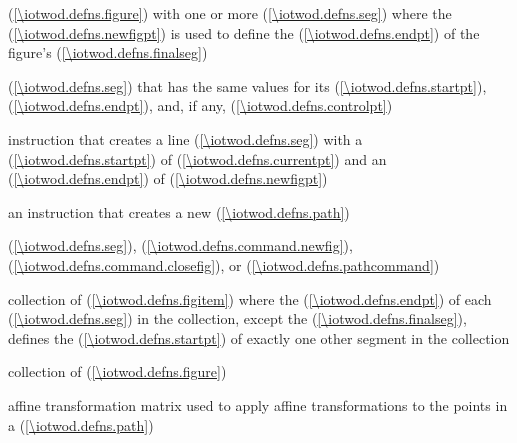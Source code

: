%
 (\ref{\iotwod.defns.figure}) with one or more  (\ref{\iotwod.defns.seg}) where the  (\ref{\iotwod.defns.newfigpt}) is used to define the  (\ref{\iotwod.defns.endpt}) of the figure's  (\ref{\iotwod.defns.finalseg})

%
 (\ref{\iotwod.defns.seg}) that has the same values for its  (\ref{\iotwod.defns.startpt}),  (\ref{\iotwod.defns.endpt}), and, if any,  (\ref{\iotwod.defns.controlpt})

%
 instruction that creates a line  (\ref{\iotwod.defns.seg}) with a  (\ref{\iotwod.defns.startpt}) of  (\ref{\iotwod.defns.currentpt}) and an  (\ref{\iotwod.defns.endpt}) of  (\ref{\iotwod.defns.newfigpt})

%
 an instruction that creates a new  (\ref{\iotwod.defns.path})

%
 (\ref{\iotwod.defns.seg}),  (\ref{\iotwod.defns.command.newfig}),  (\ref{\iotwod.defns.command.closefig}), or  (\ref{\iotwod.defns.pathcommand})

%
collection of  (\ref{\iotwod.defns.figitem}) where the  (\ref{\iotwod.defns.endpt}) of each  (\ref{\iotwod.defns.seg}) in the collection, except the  (\ref{\iotwod.defns.finalseg}), defines the  (\ref{\iotwod.defns.startpt}) of exactly one other segment in the collection

%
collection of  (\ref{\iotwod.defns.figure})

%
affine transformation matrix used to apply affine transformations to the points in a  (\ref{\iotwod.defns.path})

